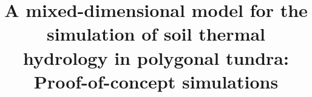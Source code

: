 \documentclass[review]{elsarticle}
\begin{document}
\begin{frontmatter}

\title{A mixed-dimensional model for the simulation of soil thermal hydrology in polygonal tundra: Proof-of-concept simulations}





\begin{abstract}



\end{abstract}
\end{frontmatter}
\end{document}

